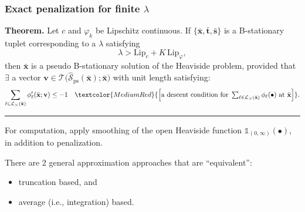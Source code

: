 \documentclass[aspectratio=169,xcolor=dvipsnames]{beamer}
\begin{document}
\begin{frame}
  \frametitle{Exact penalization for finite $\lambda$}
  \footnotesize
  \setlength{\abovedisplayskip}{4pt}
  \setlength{\belowdisplayskip}{4pt}

  \textbf{Theorem.} Let $c$ and $\varphi_k$ be Lipschitz continuous. If
  $\{\bar{\mathbf{x}},\bar{\mathbf{t}},\bar{\mathbf{s}}\}$ is a B-stationary
  tuplet corresponding to a $\lambda$ satisfying
  \[
    \lambda>\mathrm{Lip}_c+K\,\mathrm{Lip}_\varphi,
  \]
  then $\bar{\mathbf{x}}$ is a pseudo B-stationary solution of the Heaviside
  problem, provided that $\exists$ a vector
  $\mathbf{v}\in\mathcal{T}\bigl(\widehat{\mathcal{S}}_{\mathrm{ps}}
  (\bar{\mathbf{x}});\bar{\mathbf{x}}\bigr)$ with unit length satisfying:
  \[
    \sum_{\ell\in\mathcal{L}_>(\bar{\mathbf{x}})}
      \phi_\ell'(\bar{\mathbf{x}};\mathbf{v})\leq -1
    \quad\textcolor{MediumRed}{\Bigl[\text{a descent condition for }
      \textstyle\sum_{\ell\in\mathcal{L}_>(\bar{\mathbf{x}})}
      \phi_\ell(\bullet)\text{ at }\bar{\mathbf{x}}\Bigr]}.
  \]

  \vspace{0.06cm}
  {\color{MediumBlack}\rule{\linewidth}{0.4pt}}
  \vspace{0.06cm}

  For computation, apply \textcolor{MediumRed}{smoothing} of the open
  Heaviside function $\mathds{1}_{(0,\infty)}(\bullet)$, in addition to
  penalization.

  \vspace{0.06cm}
  There are 2 general approximation approaches that are ``equivalent'':
  \begin{itemize}
    \setlength{\itemsep}{0.04cm}
    \item[(i)] truncation based, and
    \item[(ii)] average (i.e., integration) based.
  \end{itemize}
\end{frame}
\end{document}
